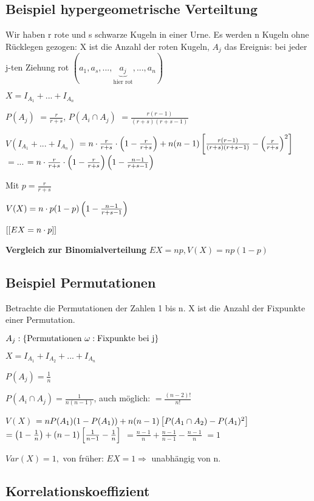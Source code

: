 \renewcommand{\ldate}{2015-12-14}

\subsection{Beispiel hypergeometrische Verteiltung}
Wir haben r rote und s schwarze Kugeln in einer Urne. Es werden n Kugeln ohne Rücklegen gezogen: X ist die Anzahl der roten Kugeln, $A_j$ das Ereignis: bei jeder j-ten Ziehung rot $(a_1, a_s, ..., \underbrace{a_j}_{\textrm{hier rot}}, ..., a_n)$

$X = I_{A_1} + ... + I_{A_n}$

$P(A_j)$
$=\frac{r}{r+s}$, 
$P(A_i \cap A_j)$
$=\frac{r(r-1)}{(r+s)(r+s-1)}$

$V(I_{A_1} + ... + I_{A_n}) $
$=n\cdot \frac{r}{r+s} \cdot  \left( 1-\frac{r}{r+s} \right)  + n(n-1)  \left[ \frac{r(r-1)}{(r+s)(r+s-1)} -  \left( \frac{r}{r+s} \right) ^2 \right] $
$=...$
$=n\cdot \frac{r}{r+s} \cdot  \left( 1-\frac{r}{r+s} \right)   \left( 1-\frac{n-1}{r+s-1} \right) $

Mit $p=\frac{r}{r+s}$ 

$V(X) = n\cdot p(1-p)  \left( 1- \frac{n-1}{r+s-1} \right) $

$[ \left[ EX=n \cdot p \right] ]$

\textbf{Vergleich zur Binomialverteilung} $EX = np, V(X)=np(1-p)$

\subsection{Beispiel Permutationen}
Betrachte die Permutationen der Zahlen 1 bis n. X ist die Anzahl der Fixpunkte einer Permutation.

$A_j:  \left\lbrace \textrm{Permutationen }\omega : \textrm{Fixpunkte bei j} \right\rbrace $ 

$ X = I_{A_1} + I_{A_2} + ... + I_{A_n}$

$P(A_j) = \frac{1}{n}$

$P(A_i\cap A_j) = \frac{1}{n(n-1)}$, auch möglich: $= \frac{(n-2)!}{n!}$

$ V(X) $
$=n P(A_1)(1-P(A_1))+ n(n-1)  \left[ P(A_1\cap A_2) - P(A_1)^2 \right] $
$= \left( 1-\frac{1}{n} \right)  + (n-1)  \left[ \frac{1}{n-1} - \frac{1}{n} \right] $
$=\frac{n-1}{n} + \frac{n-1}{n-1} - \frac{n-1}{n}$
$= 1$

$Var(X) = 1, $ von früher: $EX =1 \Rightarrow $ unabhängig von n.

\subsection{Korrelationskoeffizient}


